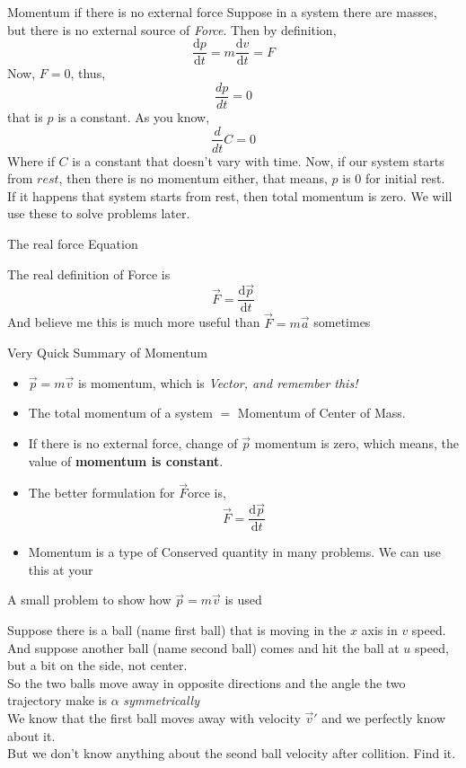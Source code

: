 \documentclass[9pt,serif]{beamer}
\newenvironment{myitemize}{\begin{itemize}}{\end{itemize}}
\newcommand{\prob}[1]{ \begin{problem.} #1 \end{problem.}}
\newcommand{\id}[1]{ \begin{idea} #1 \end{idea} }
\newcommand{\draw}[3]{ \begin{figure}[hbt!] \centering
 \fontsize{35pt}{20pt}\selectfont \resizebox{#1 \textwidth}{!}{
{#2.pdf_tex}}\caption{#3} \label{#3} \end{figure} }
\newcommand{\sides}[2]{ \begin{minipage}{0.5\textwidth} #1
    \end{minipage}\hfill%
\begin{minipage}{0.5\textwidth} #2 \end{minipage} }
\begin{document}
\begin{frame}{ Momentum if there is no external force} 
    Suppose in a system there are masses, but there is no external source of \emph{Force}. Then by definition,  
    \[ \frac{\mathrm d p}{\mathrm d t} = m \frac{\mathrm d v}{ \mathrm d t} = F \]
    Now, $F=0$, thus, \[ \frac{dp}{dt}=0 \] that is $p$ is a constant. 
    As you know, \[ \frac{d}{dt} C =0 \]
    Where if $C$ is a constant that doesn't vary with time. Now, if our system starts from $rest$, then there is no momentum either, that means,  $p$ is $0$ for initial rest. \\ \pause
    If it happens that system starts from rest, then total momentum is zero. We will use these to solve problems later. 
\end{frame}
%
%
\begin{frame}
    {The real force Equation}
    \id{The real definition of Force is 
        \[ \vec F= \frac{\mathrm d \vec p}{\mathrm d t} \]
    And believe me this is much more useful than $\vec F = m \vec a$ sometimes} 
\end{frame}

\begin{frame}
    {Very Quick Summary of Momentum}
    \begin{myitemize}
    \item $\vec p = m \vec v$ is momentum, which is \emph{Vector, and remember this!}\pause
    \item The total momentum of a system $=$ Momentum of Center of Mass. \pause
    \item If there is no external force, change of $\vec p$ momentum is zero, which means, the value of \textbf{momentum is constant}. \pause
    \item The better formulation for $\vec F$orce is, 
        \[ \vec F = \frac{\mathrm d \vec p}{\mathrm d t} \]
    \item Momentum is a type of Conserved quantity in many problems. We can use this at your    
    \end{myitemize}
\end{frame}




\begin{frame}
    {A small problem to show how $\vec p = m \vec v$ is used}
    \sides{
        \prob{ 
            Suppose there is a ball (name first ball) that is moving in the $x$ axis in $v$ speed. And suppose another ball (name second ball) comes and hit the ball at $u$ speed, but a bit on the side, not center.\\ 
            So the two balls move away in opposite directions and the angle the two trajectory make is $\alpha$ \emph{symmetrically} \\ 
            We know that the first ball moves away with velocity $\vec v'$ and we perfectly know about it. \\

        But we don't know anything about the seond ball velocity after collition. Find it.}}{ 
    \draw{1}{prob4_1}{ 
}}
\end{frame}
\end{document}
